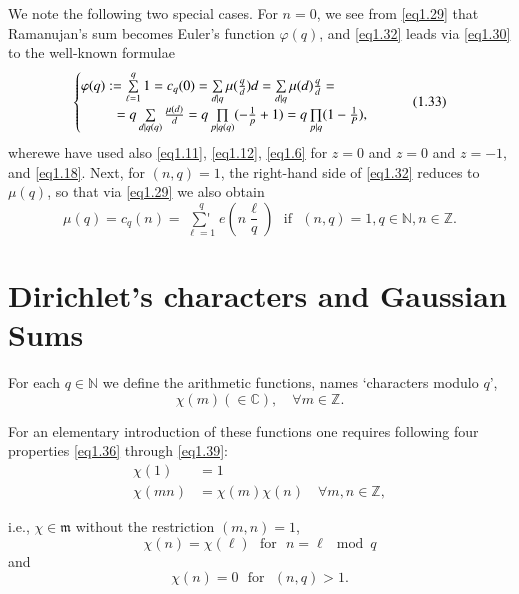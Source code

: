 We note the following two special cases. For $n=0$, we see from
\eqref{eq1.29} that Ramanujan's sum becomes Euler's function $\varphi(q)$,
and \eqref{eq1.32} leads via \eqref{eq1.30} to the well-known formulae  
\begin{equation*}%
\begin{cases}
\varphi(q): =\sum\limits^q_{\ell=1}  1 = c_q(0)= \sum\limits_{d|q}\mu (\frac{q}{d})d=\sum\limits_{d|q}\mu(d) \frac{q}{d}=\\
\hspace{0.9cm}= q \sum\limits_{d|q(q)} \frac{\mu (d)}{d} = q \prod\limits_{
p|q(q)} (-\frac{1}{p}+1)= q\prod\limits_{p|q}(1-\frac{1}{P}),
\end{cases}\tag{1.33}\label{eq1.33}
\end{equation*}
where\pageoriginale we have used also \eqref{eq1.11}, \eqref{eq1.12},
\eqref{eq1.6} for 
$z=0$ and $z=0$ and $z=-1$, and \eqref{eq1.18}. Next, for $(n,q)=1$, the
right-hand side of \eqref{eq1.32} reduces to $\mu (q)$, so that via
\eqref{eq1.29} we also obtain  
\begin{equation*}%
\mu (q)=c_q(n)=\mathop{\sum{}'}\limits^q_{\ell=1} e(n\frac{\ell}{q}) \text{~ if~ }
(n,q)=1, q\in \mathbb{N}, n\in\mathbb{Z}. \tag{1.34}\label{eq1.34} 
\end{equation*}


\section{Dirichlet's characters and Gaussian Sums}\label{chap1-sec3} 

For each $q \in \mathbb{N}$ we define the arithmetic functions, names
`characters modulo $q$',  
\begin{equation*}%
\chi (m)(\in \mathbb{C}), \quad  \forall m \in
\mathbb{Z}. \tag{1.35}\label{eq1.35} 
\end{equation*}

For  an elementary introduction of these functions one requires
following four properties \eqref{eq1.36} through \eqref{eq1.39}: 
\begin{align*}%
\chi(1) & = 1 \tag{1.36}\label{eq1.36}\\
\chi (mn) & = \chi (m)\chi (n) \quad \forall m, n\in \mathbb{Z},
\tag{1.37} \label{eq1.37}
\end{align*}

i.e., $\chi\in \mathfrak{m}$ without the restriction $(m,n)=1$,
\begin{equation*}%
\chi (n)= \chi (\ell)   \text{~ for~ } n =\ell \mod q
\tag{1.38}\label{eq1.38} 
\end{equation*}
and 
\begin{equation*}%
\chi (n)=0    \text{~ for~ } (n,q)>1. \tag{1.39}\label{eq1.39}
\end{equation*}

